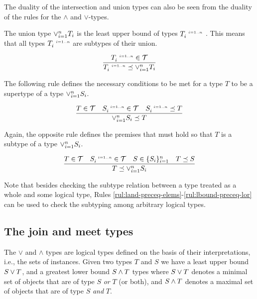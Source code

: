 \documentclass[runningheads]{llncs}
\newcommand{\s}{\scriptscriptstyle\ \,}
\newcommand{\T}{{\cal T}}
\begin{document}
The duality of the intersection and union types can also be seen from
the duality of the rules for the $\land$ and $\lor$-types.

The union type $\lor_{i=1}^n\/T_i$ is the least upper bound of
types $T_i^{\s\/i=1..n}$ \cite{Pierce1991}. This means that all types
$T_i^{\s\/i=1..n}$ are subtypes of their union. 

\begin{equation}
\label{rul:lor-preceq-elems}
\dfrac{T_i^{\s\/i=1..n}\in\T}
      {T_i^{\s\/i=1..n}\preceq\lor_{i=1}^n\/T_i}
\end{equation}

The following rule defines the necessary conditions to be met for a
type $T$ to be a supertype of a type $\lor_{i=1}^n\/S_i$.

\begin{equation}
\label{rul:lor-preceq-ubound}
\dfrac{T\in\T\quad\/S_i^{\s\/i=1..n}\in\T\quad\/S_i^{\s\/i=1..n}\preceq\/T}
      {\lor_{i=1}^n\/S_i\preceq\/T}  
\end{equation}

Again, the opposite rule defines the premises that must hold so that
$T$ is a subtype of a type $\lor_{i=1}^n\/S_i$.

\begin{equation}
\label{rul:lbound-preceq-lor}
\dfrac{T\in\T\quad\/S_i^{\s\/i=1..n}\in\T\quad\/S\in\{S_i\}_{i=1}^n\quad\/T\preceq\/S}
      {T\preceq\lor_{i=1}^n\/S_i}  
\end{equation}

Note that besides checking the subtype relation between a type treated
as a whole and some logical type, Rules
\ref{rul:land-preceq-elems}-\ref{rul:lbound-preceq-lor} can be used to
check the subtyping among arbitrary logical types.






\subsection{The join and meet types\label{sec:join-meet-types}}

The $\lor$ and $\land$ types are logical types defined on the basis of
their interpretations, i.e., the sets of instances. Given two types
$T$ and $S$ we have a least upper bound $S\lor\/T$, and a greatest
lower bound $S\land\/T$ types where $S\lor\/T$ denotes a minimal set
of objects that are of type $S$ \emph{or} $T$ (or both), and
$S\land\/T$ denotes a maximal set of objects that are of type $S$
\emph{and} $T$.
\end{document}
